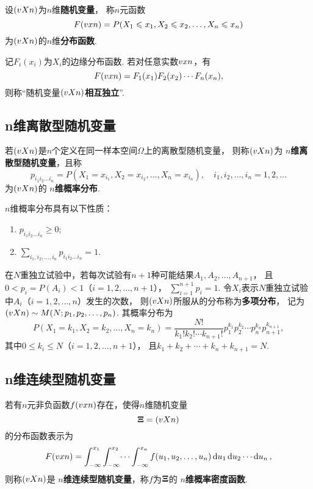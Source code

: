 \begin{definition}
设\((v{X}{n})\)为\(n\)维\textbf{随机变量}，%
称\(n\)元函数\[
F(v{x}{n})
= P(X_1 \leqslant x_1,X_2 \leqslant x_2,\dotsc,X_n \leqslant x_n)
\]为\((v{X}{n})\)的\(n\)维\textbf{分布函数}.
\end{definition}

\begin{definition}
记\(F_i(x_i)\)为\(X_i\)的边缘分布函数.
若对任意实数\(v{x}{n}\)，有\[
F(v{x}{n}) = F_1(x_1) F_2(x_2) \dotsm F_n(x_n),
\]则称“随机变量\((v{X}{n})\)\textbf{相互独立}”.
\end{definition}

\subsection{n维离散型随机变量}
\begin{definition}
若\((v{X}{n})\)是\(n\)个定义在同一样本空间\(\Omega\)上的离散型随机变量，%
则称\((v{X}{n})\)为\textbf{ \(n\)维离散型随机变量}，且称\[
p_{i_1 i_2 \dotso i_n}
= P(X_1=x_{i_1},X_2=x_{i_2},\dotsc,X_n=x_{i_n}),
\quad i_1,i_2,\dotsc,i_n=1,2,\dotsc
\]为\((v{X}{n})\)的\textbf{ \(n\)维概率分布}.
\end{definition}

\begin{property}
\(n\)维概率分布具有以下性质：
\begin{enumerate}
\item \(p_{i_1 i_2 \dotso i_n} \geqslant 0\);
\item \(\sum\limits_{i_1,i_2,\dotsc,i_n}{p_{i_1 i_2 \dotso i_n}} = 1\).
\end{enumerate}
\end{property}

\begin{definition}
在\(N\)重独立试验中，若每次试验有\(n+1\)种可能结果\(A_1,A_2,\dotsc,A_{n+1}\)，%
且\(0<p_i=P(A_i)<1\)（\(i=1,2,\dotsc,n+1\)），%
\(\sum\limits_{i=1}^{n+1}{p_i}=1\).
令\(X_i\)表示\(N\)重独立试验中\(A_i\)（\(i=1,2,\dotsc,n\)）发生的次数，%
则\((v{X}{n})\)所服从的分布称为\textbf{多项分布}，%
记为\((v{X}{n}) \sim M(N;p_1,p_2,\dotsc,p_n)\).
其概率分布为\[
P(X_1=k_1,X_2=k_2,\dotsc,X_n=k_n)
= \frac{N!}{k_1! k_2!\dotsm k_{n+1}!} p_1^{k_1} p_2^{k_2} \dotsm p_n^{k_n} p_{n+1}^{k_{n+1}},
\]
其中\(0 \leqslant k_i \leqslant N\)（\(i=1,2,\dotsc,n+1\)），%
且\(k_1 + k_2 + \dotsb + k_n + k_{n+1} = N\).
\end{definition}

\subsection{n维连续型随机变量}
\begin{definition}
若有\(n\)元非负函数\(f(v{x}{n})\)存在，使得\(n\)维随机变量\[
\boldsymbol{\Xi} = (v{X}{n})
\]的分布函数表示为\[
F(v{x}{n})
= \int_{-\infty}^{x_1} \int_{-\infty}^{x_2} \dotsi \int_{-\infty}^{x_n}
	f(u_1,u_2,\dotsc,u_n) \dd{u_1} \dd{u_2} \dotsm \dd{u_n},
\]则称\((v{X}{n})\)是\textbf{ \(n\)维连续型随机变量}，称\(f\)为\(\boldsymbol{\Xi}\)的\textbf{ \(n\)维概率密度函数}.
\end{definition}


